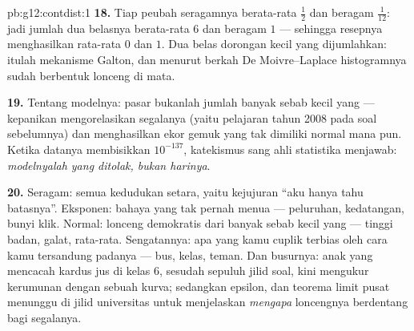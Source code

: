 \begin{solution}{pb:g12:contdist:1}
\textbf{18.} Tiap peubah seragamnya berata-rata $\frac12$ dan beragam
$\frac{1}{12}$: jadi jumlah dua belasnya berata-rata $6$ dan beragam
$1$ --- sehingga resepnya menghasilkan rata-rata $0$ dan  $1$. Dua belas
dorongan kecil yang  dijumlahkan: itulah mekanisme Galton, dan menurut
berkah De Moivre--Laplace histogramnya sudah
berbentuk lonceng di mata.

\textbf{19.} Tentang modelnya: pasar bukanlah jumlah banyak
sebab kecil yang \emph{} --- kepanikan mengorelasikan
segalanya (yaitu pelajaran tahun 2008 pada soal sebelumnya) dan
menghasilkan ekor gemuk yang tak dimiliki  normal mana pun. Ketika datanya
membisikkan $10^{-137}$, katekismus sang ahli statistika menjawab:
\emph{modelnyalah yang ditolak, bukan harinya}.

\textbf{20.} Seragam: semua kedudukan setara, yaitu kejujuran ``aku
hanya tahu batasnya''. Eksponen: bahaya yang tak pernah
menua --- peluruhan, kedatangan, bunyi klik. Normal: lonceng
demokratis dari banyak sebab kecil yang  --- tinggi badan, galat,
rata-rata. Sengatannya: apa yang kamu cuplik terbias oleh cara kamu tersandung
padanya --- bus, kelas, teman. Dan busurnya: anak
yang mencacah kardus jus di kelas 6, sesudah sepuluh jilid
soal, kini mengukur kerumunan dengan sebuah kurva; sedangkan epsilon,
 dan teorema limit pusat menunggu di
jilid universitas untuk menjelaskan \emph{mengapa} loncengnya berdentang bagi
segalanya.

\end{solution}
